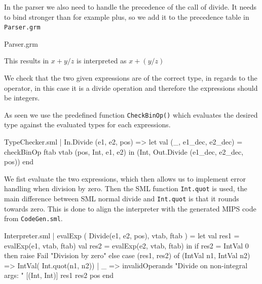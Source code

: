 \documentclass[11pt,a4paper,oneside]{report}
\begin{document}
In the parser we also need to handle the precedence of the call of divide. It needs to bind stronger than for example plus, so we add it to the precedence table in \texttt{Parser.grm}
\begin{code}[firstnumber=26]{Parser.grm}
\end{code}
This results in $x + y / z$ is interpreted as $x + (y / z)$

We check that the two given expressions are of the correct type, in regards to the operator, in this case it is a divide operation and therefore the expressions should be integers.

As seen we use the predefined function \texttt{CheckBinOp()} which evaluates the desired type against the evaluated types for each expressions.
\begin{code}[firstnumber=112]{TypeChecker.sml}
| In.Divide (e1, e2, pos)
  => let val (_, e1_dec, e2_dec) =
            checkBinOp ftab vtab (pos, Int, e1, e2)
     in (Int,
         Out.Divide (e1_dec, e2_dec, pos))
     end
\end{code}

We fist evaluate the two expressions, which then allows us to implement error handling when division by zero. Then the SML function \texttt{Int.quot} is used, the main difference between SML normal divide and \texttt{Int.quot} is that it rounds towards zero. This is done to align the interpreter with the generated MIPS code from \texttt{CodeGen.sml}.

\begin{code}[firstnumber=170]{Interpreter.sml}
| evalExp ( Divide(e1, e2, pos), vtab, ftab ) =
    let
      val res1   = evalExp(e1, vtab, ftab)
      val res2   = evalExp(e2, vtab, ftab)
    in
      if res2 = IntVal 0 then raise Fail "Division by zero"
        else
          case (res1, res2) of
            (IntVal n1, IntVal n2) => IntVal( Int.quot(n1, n2))
            | _ => invalidOperands
                "Divide on non-integral args: "
                    [(Int, Int)] res1 res2 pos
    end
\end{code}
\end{document}
